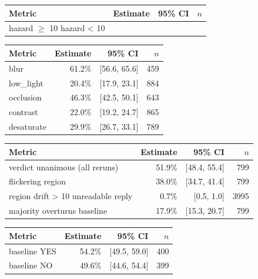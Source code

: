 \begin{tabular}{lrrr}
\toprule
Metric & Estimate & 95\% CI & $n$ \\
\midrule
hazard $\geq$ 10%
hazard < 10%
\bottomrule
\end{tabular}

\begin{tabular}{lrrr}
\toprule
Metric & Estimate & 95\% CI & $n$ \\
\midrule
blur & 61.2\% & [56.6, 65.6] & 459 \\
low\_light & 20.4\% & [17.9, 23.1] & 884 \\
occlusion & 46.3\% & [42.5, 50.1] & 643 \\
contrast & 22.0\% & [19.2, 24.7] & 865 \\
desaturate & 29.9\% & [26.7, 33.1] & 789 \\
\bottomrule
\end{tabular}

\begin{tabular}{lrrr}
\toprule
Metric & Estimate & 95\% CI & $n$ \\
\midrule
verdict unanimous (all reruns) & 51.9\% & [48.4, 55.4] & 799 \\
flickering region & 38.0\% & [34.7, 41.4] & 799 \\
region drift > 10%
unreadable reply & 0.7\% & [0.5, 1.0] & 3995 \\
majority overturns baseline & 17.9\% & [15.3, 20.7] & 799 \\
\bottomrule
\end{tabular}

\begin{tabular}{lrrr}
\toprule
Metric & Estimate & 95\% CI & $n$ \\
\midrule
baseline YES & 54.2\% & [49.5, 59.0] & 400 \\
baseline NO & 49.6\% & [44.6, 54.4] & 399 \\
\bottomrule
\end{tabular}

